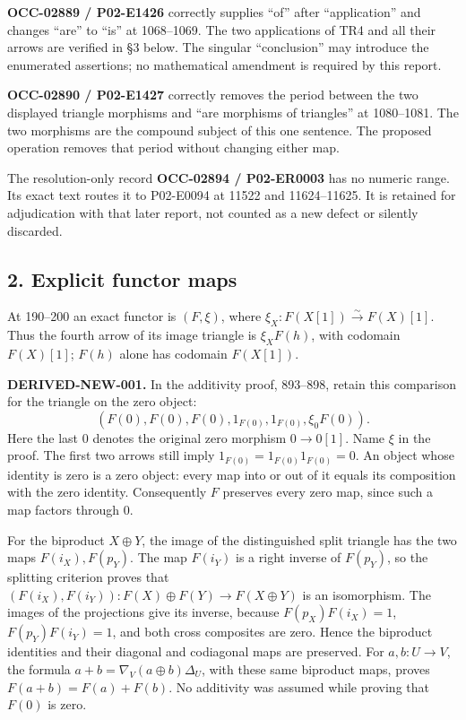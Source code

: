 \documentclass[11pt]{article}
\begin{document}
\textbf{OCC-02889 /\allowbreak{} P02-E1426} correctly supplies ``of'' after ``application'' and changes ``are'' to ``is'' at 1068–\allowbreak{}1069. The two applications of TR4 and all their arrows are verified in §3 below. The singular ``conclusion'' may introduce the enumerated assertions; no mathematical amendment is required by this report.

\textbf{OCC-02890 /\allowbreak{} P02-E1427} correctly removes the period between the two displayed triangle morphisms and ``are morphisms of triangles'' at 1080–\allowbreak{}1081. The two morphisms are the compound subject of this one sentence. The proposed operation removes that period without changing either map.

The resolution-only record \textbf{OCC-02894 /\allowbreak{} P02-ER0003} has no numeric range. Its exact text routes it to P02-E0094 at 11522 and 11624–\allowbreak{}11625. It is retained for adjudication with that later report,\allowbreak{} not counted as a new defect or silently discarded.

\subsection{2. Explicit functor maps}\label{proofs-0001-1140-explicit-functor-maps}

At 190–\allowbreak{}200 an exact functor is \((F,\xi)\),\allowbreak{} where \(\xi_X:F(X[1])\xrightarrow{\sim}F(X)[1]\). Thus the fourth arrow of its image triangle is \(\xi_XF(h)\),\allowbreak{} with codomain \(F(X)[1]\); \(F(h)\) alone has codomain \(F(X[1])\).

\textbf{DERIVED-NEW-001.} In the additivity proof,\allowbreak{} 893–\allowbreak{}898,\allowbreak{} retain this comparison for the triangle on the zero object:\allowbreak{} \[
(F(0),F(0),F(0),1_{F(0)},1_{F(0)},\xi_0F(0)).
\] Here the last \(0\) denotes the original zero morphism \(0\to0[1]\). Name \(\xi\) in the proof. The first two arrows still imply \(1_{F(0)}=1_{F(0)}1_{F(0)}=0\). An object whose identity is zero is a zero object:\allowbreak{} every map into or out of it equals its composition with the zero identity. Consequently \(F\) preserves every zero map,\allowbreak{} since such a map factors through \(0\).

For the biproduct \(X\oplus Y\),\allowbreak{} the image of the distinguished split triangle has the two maps \(F(i_X),F(p_Y)\). The map \(F(i_Y)\) is a right inverse of \(F(p_Y)\),\allowbreak{} so the splitting criterion proves that \((F(i_X),F(i_Y)):F(X)\oplus F(Y)\to F(X\oplus Y)\) is an isomorphism. The images of the projections give its inverse,\allowbreak{} because \(F(p_X)F(i_X)=1\),\allowbreak{} \(F(p_Y)F(i_Y)=1\),\allowbreak{} and both cross composites are zero. Hence the biproduct identities and their diagonal and codiagonal maps are preserved. For \(a,b:U\to V\),\allowbreak{} the formula \(a+b=\nabla_V(a\oplus b)\Delta_U\),\allowbreak{} with these same biproduct maps,\allowbreak{} proves \(F(a+b)=F(a)+F(b)\). No additivity was assumed while proving that \(F(0)\) is zero.
\end{document}
